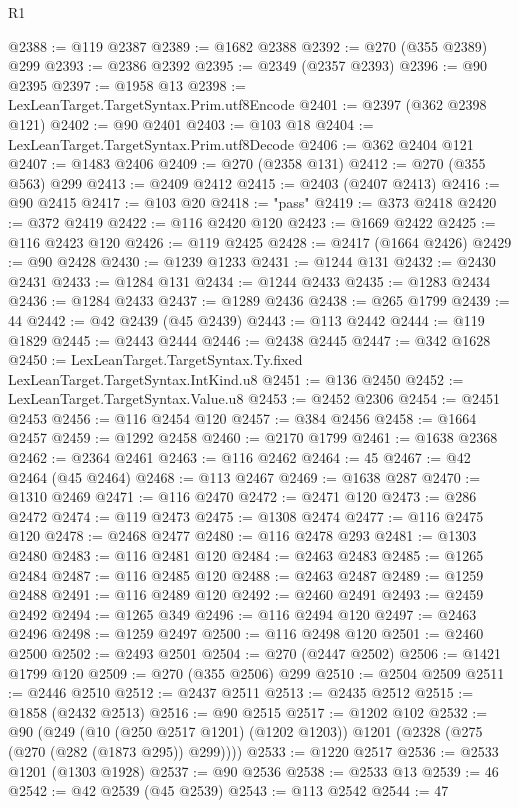 \begin{lexlean}{R1}
\begin{coremodule}
@2388 := @119 @2387
@2389 := @1682 @2388
@2392 := @270 (@355 @2389) @299
@2393 := @2386 @2392
@2395 := @2349 (@2357 @2393)
@2396 := @90 @2395
@2397 := @1958 @13
@2398 := LexLeanTarget.TargetSyntax.Prim.utf8Encode
@2401 := @2397 (@362 @2398 @121)
@2402 := @90 @2401
@2403 := @103 @18
@2404 := LexLeanTarget.TargetSyntax.Prim.utf8Decode
@2406 := @362 @2404 @121
@2407 := @1483 @2406
@2409 := @270 (@2358 @131)
@2412 := @270 (@355 @563) @299
@2413 := @2409 @2412
@2415 := @2403 (@2407 @2413)
@2416 := @90 @2415
@2417 := @103 @20
@2418 := "pass"
@2419 := @373 @2418
@2420 := @372 @2419
@2422 := @116 @2420 @120
@2423 := @1669 @2422
@2425 := @116 @2423 @120
@2426 := @119 @2425
@2428 := @2417 (@1664 @2426)
@2429 := @90 @2428
@2430 := @1239 @1233
@2431 := @1244 @131
@2432 := @2430 @2431
@2433 := @1284 @131
@2434 := @1244 @2433
@2435 := @1283 @2434
@2436 := @1284 @2433
@2437 := @1289 @2436
@2438 := @265 @1799
@2439 := 44
@2442 := @42 @2439 (@45 @2439)
@2443 := @113 @2442
@2444 := @119 @1829
@2445 := @2443 @2444
@2446 := @2438 @2445
@2447 := @342 @1628
@2450 := LexLeanTarget.TargetSyntax.Ty.fixed LexLeanTarget.TargetSyntax.IntKind.u8
@2451 := @136 @2450
@2452 := LexLeanTarget.TargetSyntax.Value.u8
@2453 := @2452 @2306
@2454 := @2451 @2453
@2456 := @116 @2454 @120
@2457 := @384 @2456
@2458 := @1664 @2457
@2459 := @1292 @2458
@2460 := @2170 @1799
@2461 := @1638 @2368
@2462 := @2364 @2461
@2463 := @116 @2462
@2464 := 45
@2467 := @42 @2464 (@45 @2464)
@2468 := @113 @2467
@2469 := @1638 @287
@2470 := @1310 @2469
@2471 := @116 @2470
@2472 := @2471 @120
@2473 := @286 @2472
@2474 := @119 @2473
@2475 := @1308 @2474
@2477 := @116 @2475 @120
@2478 := @2468 @2477
@2480 := @116 @2478 @293
@2481 := @1303 @2480
@2483 := @116 @2481 @120
@2484 := @2463 @2483
@2485 := @1265 @2484
@2487 := @116 @2485 @120
@2488 := @2463 @2487
@2489 := @1259 @2488
@2491 := @116 @2489 @120
@2492 := @2460 @2491
@2493 := @2459 @2492
@2494 := @1265 @349
@2496 := @116 @2494 @120
@2497 := @2463 @2496
@2498 := @1259 @2497
@2500 := @116 @2498 @120
@2501 := @2460 @2500
@2502 := @2493 @2501
@2504 := @270 (@2447 @2502)
@2506 := @1421 @1799 @120
@2509 := @270 (@355 @2506) @299
@2510 := @2504 @2509
@2511 := @2446 @2510
@2512 := @2437 @2511
@2513 := @2435 @2512
@2515 := @1858 (@2432 @2513)
@2516 := @90 @2515
@2517 := @1202 @102
@2532 := @90
    (@249
      (@10 (@250 @2517 @1201) (@1202 @1203))
      @1201
      (@2328 (@275 (@270 (@282 (@1873 @295)) @299))))
@2533 := @1220 @2517
@2536 := @2533 @1201 (@1303 @1928)
@2537 := @90 @2536
@2538 := @2533 @13
@2539 := 46
@2542 := @42 @2539 (@45 @2539)
@2543 := @113 @2542
@2544 := 47

\end{coremodule}
\end{lexlean}
